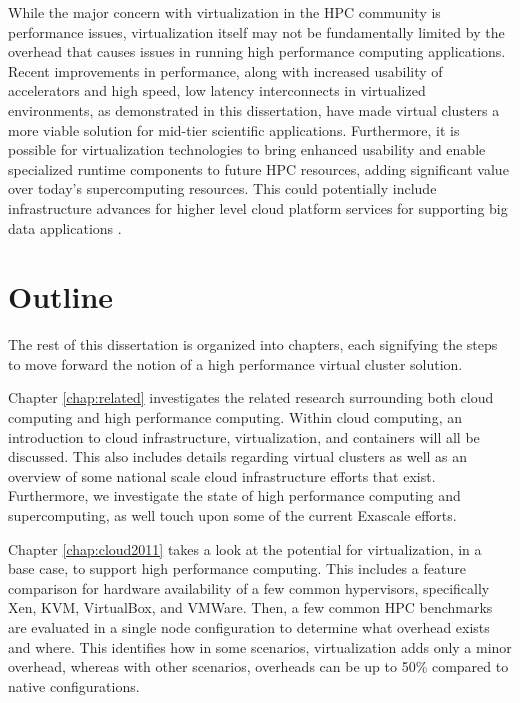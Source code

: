  
While the major concern with virtualization in the HPC community is performance issues, virtualization itself may not be fundamentally limited by the overhead that causes issues in running high performance computing applications. Recent improvements in performance, along with increased usability of accelerators and high speed, low latency interconnects in virtualized environments, as demonstrated in this dissertation, have made virtual clusters a more viable solution for mid-tier scientific applications.  Furthermore, it is possible for  virtualization technologies to bring enhanced usability and enable specialized runtime components to future HPC resources, adding significant value over today's supercomputing resources.  This could potentially include infrastructure advances for higher level cloud platform services for supporting big data applications \cite{qiu2014towards}. 







\section{Outline}
\label{sec:outline}


The rest of this dissertation is organized into chapters, each signifying the steps to move forward the notion of a high performance virtual cluster solution.

Chapter \ref{chap:related} investigates the related research surrounding both cloud computing and high performance computing. Within cloud computing, an introduction to cloud infrastructure, virtualization, and containers will all be discussed. This also includes details regarding virtual clusters as well as an overview of some national scale cloud infrastructure efforts that exist. Furthermore, we investigate the state of high performance computing and supercomputing, as well touch upon some of the current Exascale efforts.

Chapter \ref{chap:cloud2011} takes a look at the potential for virtualization, in a base case, to support high performance computing. This includes a feature comparison for hardware availability of a few common hypervisors, specifically Xen, KVM, VirtualBox, and VMWare. Then, a few common HPC benchmarks are evaluated in a single node configuration to determine what overhead exists and where. This identifies how in some scenarios, virtualization adds only a minor overhead, whereas with other scenarios, overheads can be up to 50\% compared to native configurations. 

